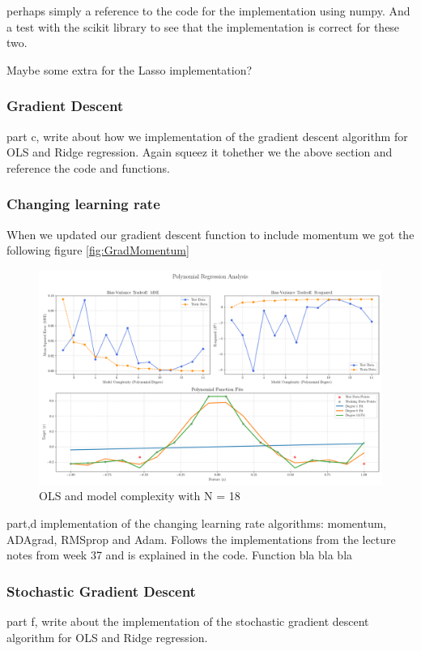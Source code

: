 \documentclass[amssymb,twocolumn,aps]{revtex4}
\begin{document}
perhaps simply a reference to the code for the implementation using numpy.
And a test with the scikit library to see that the implementation is correct for these two.

Maybe some extra for the Lasso implementation?

\subsubsection{Gradient Descent}
part c, write about how we implementation of the gradient descent algorithm for OLS and Ridge regression.
Again squeez it tohether we the above section and reference the code and functions.

\subsubsection*{Changing learning rate}

When we updated our gradient descent function to include momentum we got the following figure \ref{fig:GradMomentum} 


\begin{figure}[t]
    \centering
    \includegraphics[width=.95 \textwidth]{Figures/Combined_Analysis_OLS.png}
    \caption{OLS and model complexity with N = 18}
    \label{fig:OLS1}
\end{figure}



part,d implementation of the changing learning rate algorithms: momentum, ADAgrad, RMSprop and Adam.
Follows the implementations from the lecture notes from week 37 \cite{compfys} and is explained in the code.
Function  bla bla bla


\subsubsection*{Stochastic Gradient Descent}
part f, write about the implementation of the stochastic gradient descent algorithm for OLS and Ridge regression.
\end{document}
